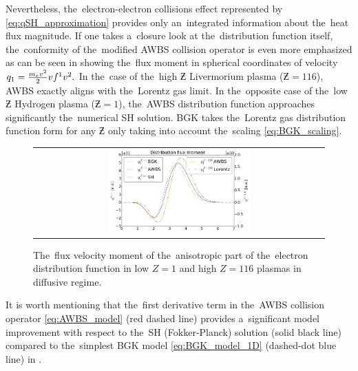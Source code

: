 Nevertheless, the~electron-electron collisions effect represented by 
\eqref{eq:qSH_approximation} provides only an~integrated information about
the~heat flux magnitude. If one takes a~closure look at the~distribution
function itself, the~conformity of the~modified AWBS collision operator
is even more emphasized as can be seen in  showing
the~flux moment in spherical coordinates of velocity
$
  q_1 = \frac{m_ev^2}{2}v f^1 v^2 .
$
In the~case of the~high $\Zbar$ Livermorium plasma ($\Zbar = 116$), 
AWBS exactly aligns with the~Lorentz gas limit. In the~opposite case of the~low
$\Zbar$ Hydrogen plasma ($\Zbar = 1$), the~AWBS distribution function 
approaches significantly the~numerical SH solution. BGK takes 
the~Lorentz gas distribution function form for any $\Zbar$ only taking into 
account the~scaling \eqref{eq:BGK_scaling}.  

\begin{figure}[tbh]
  \begin{center}
    \begin{tabular}{c}
      \includegraphics[width=0.5\textwidth]{q1s.png}
    \end{tabular}
  \caption{  
  The~flux velocity moment of the~anisotropic part of the~electron distribution 
  function in low $Z=1$ and high $Z=116$ plasmas in diffusive regime.}
  \label{fig:q1s_summary}
  \end{center} 
\end{figure}

It is worth mentioning that the~first derivative term in 
the~AWBS collision operator \eqref{eq:AWBS_model} (red dashed line) provides 
a~significant model improvement with respect to the~SH (Fokker-Planck) solution
(solid black line) compared to the~simplest BGK model \eqref{eq:BGK_model_1D}
(dashed-dot blue line) in .

